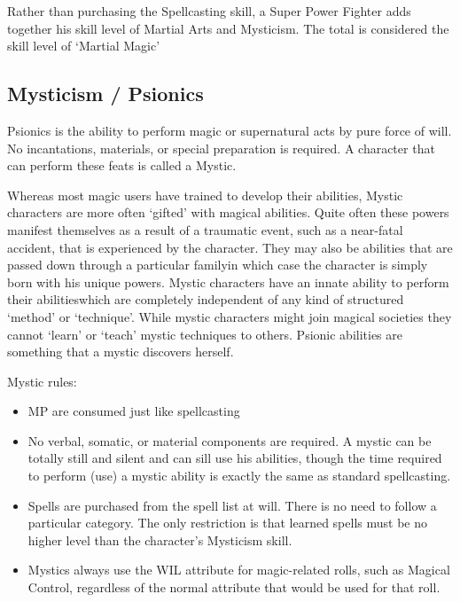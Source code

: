 \documentclass[twoside]{book}
\begin{document}
    {  
     Rather than purchasing the Spellcasting skill, a
               Super Power Fighter adds together his skill level of
               Martial Arts and Mysticism. The total is considered the
               skill level of `Martial Magic' 
    }
  
    

\subsection{Mysticism / Psionics}
    
    {  
     Psionics is the ability to perform magic or
               supernatural acts by pure force of will. No incantations,
               materials, or special preparation is required. A character
               that can perform these feats is called a Mystic. 
    }
  
    {  
     Whereas most magic users have trained to develop
               their abilities, Mystic characters are more often
               `gifted' with magical abilities. Quite often
               these powers manifest themselves as a result of a
               traumatic event, such as a near-fatal accident, that is
               experienced by the character. They may also be abilities
               that are passed down through a particular familyin
               which case the character is simply born with his unique
               powers. Mystic characters have an innate ability to
               perform their abilitieswhich are completely
               independent of any kind of structured `method'
               or `technique'. While mystic characters might
               join magical societies they cannot `learn' or
               `teach' mystic techniques to others. Psionic
               abilities are something that a mystic discovers herself.
               
    }
  
    {  
     Mystic rules: 
    }
  
\begin{itemize}
      
  \item   MP are consumed just like spellcasting 
  \item   No verbal, somatic, or material components are
                 required. A mystic can be totally still and silent and
                 can sill use his abilities, though the time required to
                 perform (use) a mystic ability is exactly the same as
                 standard spellcasting. 
  \item   Spells are purchased from the spell list at will.
                 There is no need to follow a particular category. The
                 only restriction is that learned spells must be no
                 higher level than the character's Mysticism skill.
                 
  \item   Mystics always use the WIL attribute for
                 magic-related rolls, such as Magical Control, regardless
                 of the normal attribute that would be used for that
                 roll. 
\end{itemize}
  
\end{document}
